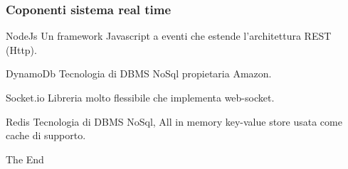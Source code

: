 \documentclass{beamer}
\begin{document}

\begin{frame}
\frametitle{Coponenti sistema real time}
\begin{block}{NodeJs}
Un framework Javascript a eventi che estende l'architettura REST (Http). 
\end{block}

\begin{block}{DynamoDb}
Tecnologia di DBMS NoSql propietaria Amazon.
\end{block}

\begin{block}{Socket.io}
Libreria molto flessibile che implementa web-socket.
\end{block}

\begin{block}{Redis}
Tecnologia di DBMS NoSql, All in memory key-value store usata come cache di supporto.
\end{block}
\end{frame}



\begin{frame}
\Huge{\centerline{The End}}
\end{frame}

\end{document}
